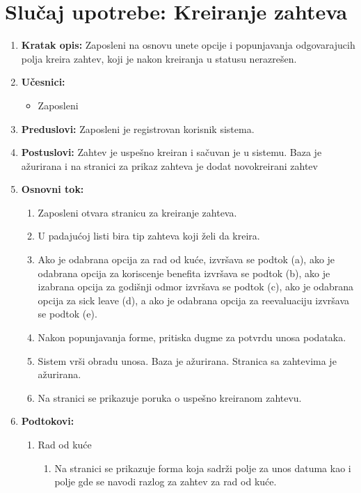 \documentclass[a4paper]{article}
\begin{document}
\section{Slučaj upotrebe: Kreiranje zahteva}
\begin{enumerate}
    \item \textbf{Kratak opis:} Zaposleni na osnovu unete opcije i popunjavanja odgovarajucih polja kreira zahtev, koji je nakon kreiranja u statusu nerazrešen.
    \item \textbf{Učesnici:}
        \begin{itemize}
            \item Zaposleni
        \end{itemize}
    \item \textbf{Preduslovi:} Zaposleni je registrovan korisnik sistema.
    \item \textbf{Postuslovi:} Zahtev je uspešno kreiran i sačuvan je u sistemu. Baza je ažurirana i na stranici za prikaz zahteva je dodat novokreirani zahtev
    \item \textbf{Osnovni tok:}
        \begin{enumerate}
            \item Zaposleni otvara stranicu za kreiranje zahteva.
            \item U padajućoj listi bira tip zahteva koji želi da kreira.
            \item Ako je odabrana opcija za rad od kuće, izvršava se podtok (a), ako je odabrana opcija za koriscenje benefita izvršava se podtok (b), ako je izabrana opcija za godišnji odmor izvršava se podtok (c), ako je odabrana opcija za sick leave (d), a ako je odabrana opcija za reevaluaciju izvršava se podtok (e).
            \item Nakon popunjavanja forme, pritiska dugme za potvrdu unosa podataka.
            \item Sistem vrši obradu unosa. Baza je ažurirana. Stranica sa zahtevima je ažurirana.
            \item Na stranici se prikazuje poruka o uspešno kreiranom zahtevu.
        \end{enumerate}
    \item \textbf{Podtokovi:}
        \begin{enumerate}
            \item Rad od kuće
            \begin{enumerate}
                \item Na stranici se prikazuje forma koja sadrži polje za unos datuma kao i polje gde se navodi razlog za zahtev za rad od kuće.

\end{enumerate}
\end{enumerate}
\end{enumerate}
\end{document}
